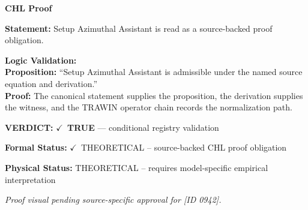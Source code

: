 \vspace{0.45em}
\noindent\textbf{CHL Proof}\par
\textbf{Statement:} Setup Azimuthal Assistant is read as a source-backed proof obligation.

\textbf{Logic Validation:}\\
\textbf{Proposition:} ``Setup Azimuthal Assistant is admissible under the named source equation and derivation.''\\
\textbf{Proof:} The canonical statement supplies the proposition, the derivation supplies the witness, and the TRAWIN operator chain records the normalization path.

\textbf{VERDICT:} \ensuremath{\checkmark}\ \textbf{TRUE} --- conditional registry validation

\textbf{Formal Status:} \ensuremath{\checkmark}\ THEORETICAL -- source-backed CHL proof obligation

\textbf{Physical Status:} THEORETICAL -- requires model-specific empirical interpretation
\par\vspace{0.45em}
\par
\vfill
\begingroup\footnotesize\itshape
Proof visual pending source-specific approval for [ID 0942].
\par\endgroup
\vfill
\endgroup
\endgroup
